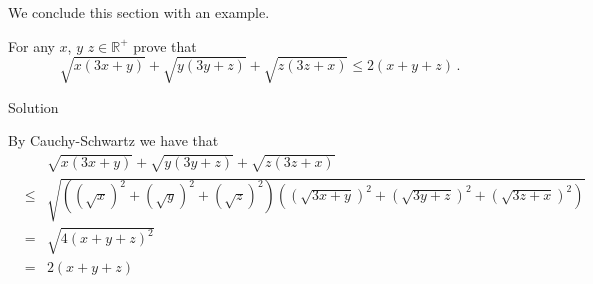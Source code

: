 
We conclude this section with an example. 

\begin{example}
For any  $x$, $y$ $z\in\mathbb{R}^+$ prove that
$$
\sqrt{x(3x+y)}+\sqrt{y(3y+z)}+\sqrt{z(3z+x)}\leq2(x+y+z)\,.
$$

Solution 

By Cauchy-Schwartz we have that
\begin{eqnarray*}
&&\sqrt{x(3x+y)}+\sqrt{y(3y+z)}+\sqrt{z(3z+x)}\\[0.2cm]
&\leq&\sqrt{\left((\sqrt{x})^2+(\sqrt{y})^2+(\sqrt{z})^2\right)\left((\sqrt{3x+y})^2+(\sqrt{3y+z})^2+(\sqrt{3z+x})^2\right)}\\[0.2cm]
&=&\sqrt{4(x+y+z)^2}\\
&=&2(x+y+z)
\end{eqnarray*}
\end{example}

